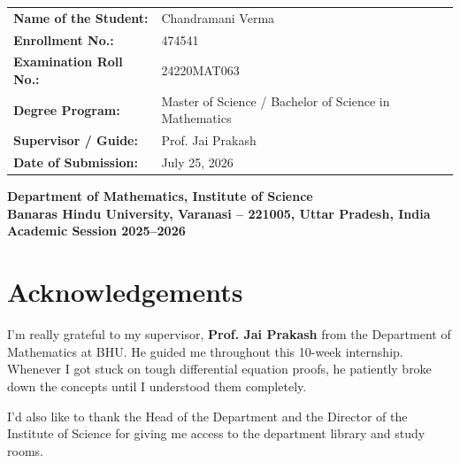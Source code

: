 \documentclass[12pt,a4paper,oneside]{article}
\theoremstyle{definition}
\theoremstyle{plain}
\begin{document}
\begin{titlepage}
    \begin{center}
    \boldmath
    \begin{tabular}{|l l|}
        \hline
        \rule{0pt}{14pt}\textbf{Name of the Student:} & Chandramani Verma \\[0.2cm]
        \textbf{Enrollment No.:} & 474541 \\[0.2cm]
        \textbf{Examination Roll No.:} & 24220MAT063 \\[0.2cm]
        \textbf{Degree Program:} & Master of Science / Bachelor of Science in Mathematics \\[0.2cm]
        \textbf{Supervisor / Guide:} & Prof. Jai Prakash \\[0.2cm]
        \textbf{Date of Submission:} & July 25, 2026 \\[0.2cm]
        \hline
    \end{tabular}
    \end{center}

    \vfill
    
    \begin{center}
        \textbf{\large Department of Mathematics, Institute of Science}\\[0.1cm]
        \textbf{\large Banaras Hindu University, Varanasi -- 221005, Uttar Pradesh, India}\\[0.1cm]
        \textbf{\large Academic Session 2025--2026}
    \end{center}
\end{titlepage}

\newpage
{}
\setcounter{page}{1}

\section*{Acknowledgements}

I'm really grateful to my supervisor, \textbf{Prof. Jai Prakash} from the Department of Mathematics at BHU. He guided me throughout this 10-week internship. Whenever I got stuck on tough differential equation proofs, he patiently broke down the concepts until I understood them completely.

\vspace{0.35cm}
I'd also like to thank the Head of the Department and the Director of the Institute of Science for giving me access to the department library and study rooms. 
\end{document}
